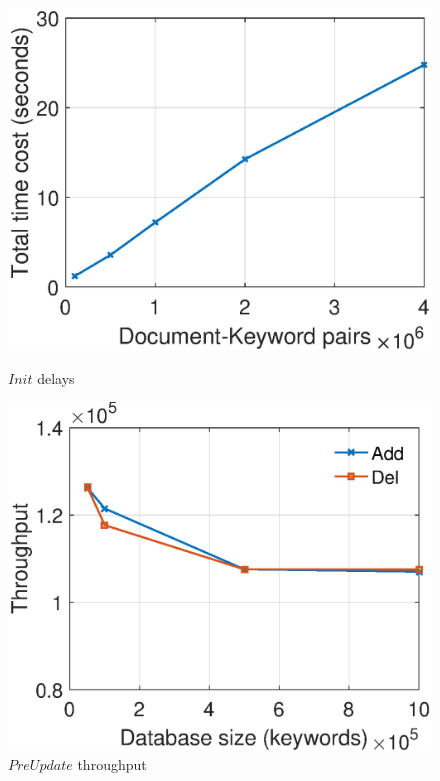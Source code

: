 \begin{figure}[bhpt]
\centering
  \begin{minipage}[b]{0.48 \textwidth}
    \includegraphics[width=\textwidth]{expr/initialization}
    \caption{$Init$ delays}
    \label{fig:init}
  \end{minipage}
  \begin{minipage}[b]{0.48 \textwidth}
    \includegraphics[width=\textwidth]{expr/update}
    \caption{$PreUpdate$ throughput}
    \label{fig:update}
  \end{minipage}


\end{figure}
